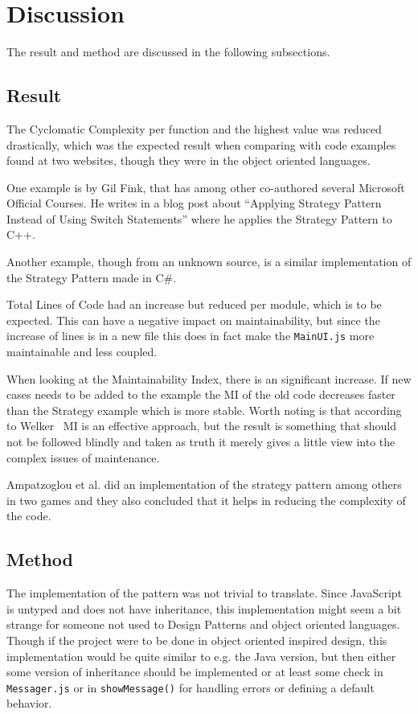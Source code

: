 \documentclass[conference, a4paper]{IEEEtran}
\begin{document}
\section{Discussion}
\label{sec:discussion}
The result and method are discussed in the following subsections.

\subsection{Result}
The Cyclomatic Complexity per function and the highest value was reduced drastically, which was the expected result when comparing with code examples found at two websites, though they were in the object oriented languages.

One example is by Gil Fink, that has among other co-authored several Microsoft Official Courses. He writes in a blog post about ``Applying Strategy Pattern Instead of Using Switch Statements'' where he applies the Strategy Pattern to C++.~\cite{bibitem:GilFink}

Another example, though from an unknown source, is a similar implementation of the Strategy Pattern made in C\#.~\cite{bibitem:CSharp}

Total Lines of Code had an increase but reduced per module, which is to be expected. This can have a negative impact on maintainability, but since the increase of lines is in a new file this does in fact make the \texttt{MainUI.js} more maintainable and less coupled.

When looking at the Maintainability Index, there is an significant increase. If new cases needs to be added to the example the MI of the old code decreases faster than the Strategy example which is more stable. Worth noting is that according to Welker~\cite{bibitem:KDWelker} MI is an effective approach, but the result is something that should not be followed blindly and taken as truth it merely gives a little view into the complex issues of maintenance.

Ampatzoglou et al. did an implementation of the strategy pattern among others in two games and they also concluded that it helps in reducing the complexity of the code.~\cite{bibitem:Game}

\subsection{Method}
The implementation of the pattern was not trivial to translate. Since JavaScript is untyped and does not have inheritance, this implementation might seem a bit strange for someone not used to Design Patterns and object oriented languages. Though if the project were to be done in object oriented inspired design, this implementation would be quite similar to e.g. the Java version, but then either some version of inheritance should be implemented or at least some check in \texttt{Messager.js} or in \texttt{showMessage()} for handling errors or defining a default behavior.
\end{document}
